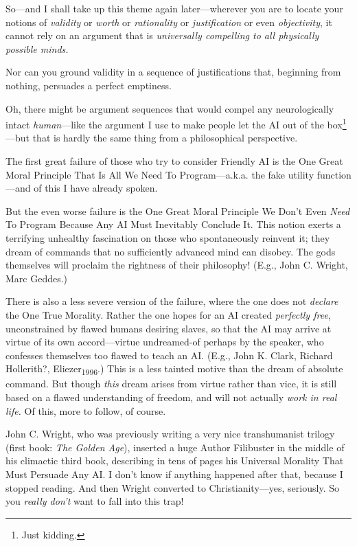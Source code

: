 {
 So---and I shall take up this theme again later---wherever you are
to locate your notions of \textit{validity} or \textit{worth} or
\textit{rationality} or \textit{justification} or even
\textit{objectivity}, it cannot rely on an argument that is
\textit{universally compelling to all physically possible minds.}}

{
 Nor can you ground validity in a sequence of justifications that,
beginning from nothing, persuades a perfect emptiness.}

{
 Oh, there might be argument sequences that would compel any
neurologically intact \textit{human}{}---like the argument I use to
make people let the AI out of the box\footnote{Just kidding.}{}---but that
is hardly the same thing from a philosophical perspective.}

{
 The first great failure of those who try to consider Friendly AI
is the One Great Moral Principle That Is All We Need To
Program---a.k.a. the fake utility function---and of this I have already
spoken.}

{
 But the even worse failure is the One Great Moral Principle We
Don't Even \textit{Need} To Program Because Any AI Must
Inevitably Conclude It. This notion exerts a terrifying unhealthy
fascination on those who spontaneously reinvent it; they dream of
commands that no sufficiently advanced mind can disobey. The gods
themselves will proclaim the rightness of their philosophy! (E.g., John
C. Wright, Marc Geddes.)}

{
 There is also a less severe version of the failure, where the one
does not \textit{declare} the One True Morality. Rather the one hopes
for an AI created \textit{perfectly free}, unconstrained by flawed
humans desiring slaves, so that the AI may arrive at virtue of its own
accord---virtue undreamed-of perhaps by the speaker, who confesses
themselves too flawed to teach an AI. (E.g., John K. Clark, Richard
Hollerith?, Eliezer\textsubscript{1996}.) This is a less tainted motive
than the dream of absolute command. But though \textit{this} dream
arises from virtue rather than vice, it is still based on a flawed
understanding of freedom, and will not actually \textit{work in real
life.} Of this, more to follow, of course.}

{
 John C. Wright, who was previously writing a very nice
transhumanist trilogy (first book: \textit{The Golden Age}), inserted a
huge Author Filibuster in the middle of his climactic third book,
describing in tens of pages his Universal Morality That Must Persuade
Any AI. I don't know if anything happened after that,
because I stopped reading. And then Wright converted to
Christianity---yes, seriously. So you \textit{really
don't} want to fall into this trap!}

